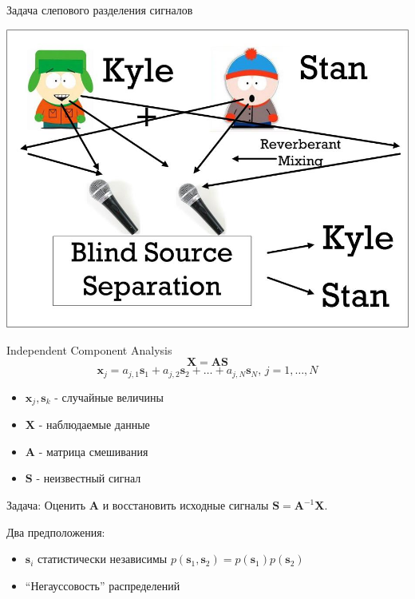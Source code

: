 \documentclass[10pt]{beamer}
\begin{document}
\begin{frame}{Задача слепового разделения сигналов}
\begin{center}
    \includegraphics[scale=0.4]{images/sk.jpg}
\end{center}
\end{frame}

\begin{frame}{Independent Component Analysis}
\[
    \mathbf{X}=\mathbf{A} \mathbf{S}
\]
\[
    \mathbf{x}_j = a_{j,1} \mathbf{s}_1 + a_{j,2} \mathbf{s}_2 + \ldots +
    a_{j,N} \mathbf{s}_N, \, j=1,\ldots, N
\]
\begin{itemize}
    \item $\mathbf{x}_j, \mathbf{s}_k$ - случайные величины
    \item $\mathbf{X}$ - наблюдаемые данные
    \item $\mathbf{A}$ - матрица смешивания
    \item $\mathbf{S}$ - неизвестный сигнал
\end{itemize}
\begin{block}{Задача:}
    Оценить $\mathbf{A}$ и восстановить исходные сигналы $\mathbf{S} =
    \mathbf{A}^{-1} \mathbf{X}$.
\end{block}
\begin{block}{Два предположения:}
\begin{itemize}
    \item $\mathbf{s}_i$ статистически независимы $p(\mathbf{s}_1, \mathbf{s}_2) =
        p(\mathbf{s}_1) p(\mathbf{s}_2)$
    \item ``Негауссовость'' распределений
\end{itemize}
\end{block}
\end{frame}
\end{document}
